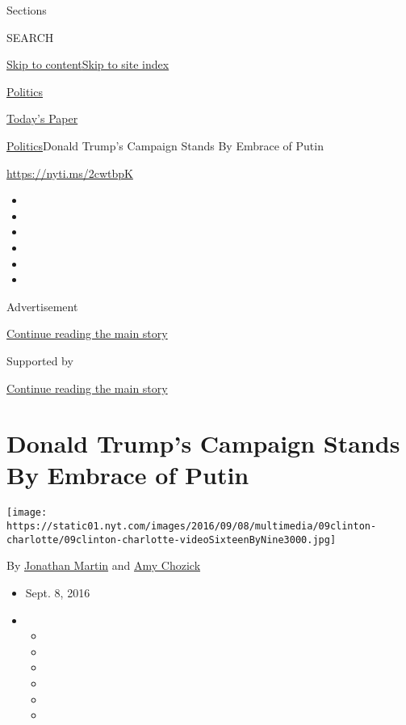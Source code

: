 Sections

SEARCH

\protect\hyperlink{site-content}{Skip to
content}\protect\hyperlink{site-index}{Skip to site index}

\href{https://www.nytimes.com/section/politics}{Politics}

\href{https://myaccount.nytimes.com/auth/login?response_type=cookie\&client_id=vi}{}

\href{https://www.nytimes.com/section/todayspaper}{Today's Paper}

\href{/section/politics}{Politics}\textbar{}Donald Trump's Campaign
Stands By Embrace of Putin

\url{https://nyti.ms/2cwtbpK}

\begin{itemize}
\item
\item
\item
\item
\item
\item
\end{itemize}

Advertisement

\protect\hyperlink{after-top}{Continue reading the main story}

Supported by

\protect\hyperlink{after-sponsor}{Continue reading the main story}

\hypertarget{donald-trumps-campaign-stands-by-embrace-of-putin}{%
\section{Donald Trump's Campaign Stands By Embrace of
Putin}\label{donald-trumps-campaign-stands-by-embrace-of-putin}}

\texttt{[image: https://static01.nyt.com/images/2016/09/08/multimedia/09clinton-charlotte/09clinton-charlotte-videoSixteenByNine3000.jpg]}

By \href{http://www.nytimes.com/by/jonathan-martin}{Jonathan Martin} and
\href{http://www.nytimes.com/by/amy-chozick}{Amy Chozick}

\begin{itemize}
\item
  Sept. 8, 2016
\item
  \begin{itemize}
  \item
  \item
  \item
  \item
  \item
  \item
  \end{itemize}
\end{itemize}

